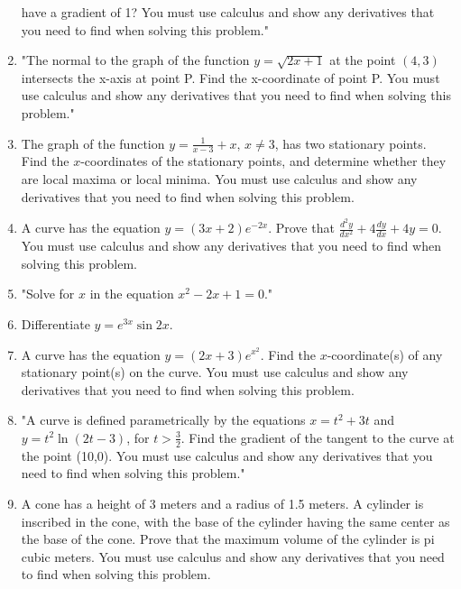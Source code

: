\documentclass{article}
\begin{document}
\begin{enumerate}
have a gradient of 1? You must use calculus and show any derivatives that you need to find when solving this problem."
\vspace{3cm}
\item "The normal to the graph of the function \( y = \sqrt{2x+1} \) at the point \( (4,3) \) intersects the x-axis at point P. Find the x-coordinate of point P. You must use calculus and show any derivatives that you need to find when solving this problem."
\vspace{3cm}
\item The graph of the function \( y = \frac{1}{x-3} + x, \, x \neq 3 \), has two stationary points. Find the \( x \)-coordinates of the stationary points, and determine whether they are local maxima or local minima. You must use calculus and show any derivatives that you need to find when solving this problem.
\vspace{3cm}
\item A curve has the equation \( y = (3x + 2)e^{-2x} \). Prove that \(\frac{d^2 y}{dx^2} + 4 \frac{dy}{dx} + 4y = 0.\) You must use calculus and show any derivatives that you need to find when solving this problem.
\vspace{3cm}
\item "Solve for \(x\) in the equation \(x^2 - 2x + 1 = 0\)."
\vspace{3cm}
\item Differentiate \( y = e^{3x} \sin 2x \).
\vspace{3cm}
\item A curve has the equation \( y = (2x + 3)e^{x^2} \). Find the \( x \)-coordinate(s) of any stationary point(s) on the curve. You must use calculus and show any derivatives that you need to find when solving this problem.
\vspace{3cm}
\item "A curve is defined parametrically by the equations \( x = t^2 + 3t \) and \( y = t^2 \ln(2t - 3) \), for \( t > \frac{3}{2} \). Find the gradient of the tangent to the curve at the point (10,0). You must use calculus and show any derivatives that you need to find when solving this problem."
\vspace{3cm}
\item A cone has a height of 3 meters and a radius of 1.5 meters. A cylinder is inscribed in the cone, with the base of the cylinder having the same center as the base of the cone. Prove that the maximum volume of the cylinder is pi cubic meters. You must use calculus and show any derivatives that you need to find when solving this problem.

\end{enumerate}
\end{document}
